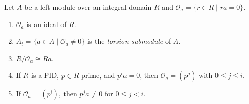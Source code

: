 Let $A$ be a left module over an integral domain $R$ and $\mathcal{O}_a = \{r \in R \mid ra = 0\}$.
\begin{enumerate}
\item[(i)] $\mathcal{O}_a$ is an ideal of $R$.
\item[(ii)] $A_t = \{a \in A \mid \mathcal{O}_a \neq 0\}$ is the \emph{torsion submodule} of $A$.
\item[(iii)] $R/\mathcal{O}_a \cong Ra$.
\item[(iv)] If $R$ is a PID, $p \in R$ prime, and $p^i a = 0$, then $\mathcal{O}_a = (p^j)$ with $0 \leq j \leq i$.
\item[(v)] If $\mathcal{O}_a = (p^i)$, then $p^j a \neq 0$ for $0 \leq j < i$.
\end{enumerate}
